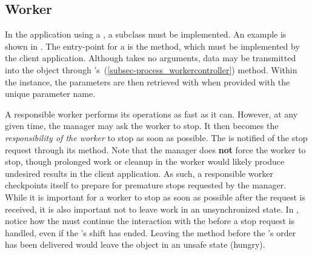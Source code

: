 \subsection{Worker}
\label{subsec-process_worker}

In the application using a , a  subclass must be
implemented.  An example  is shown in
.
The entry-point for a  is the 
method, which must be implemented by the client application.  Although
 takes no arguments, data may be transmitted
into the object through
's~(\ref{subsec-process_workercontroller})
 method.  Within the  instance,
the parameters are then retrieved with  when
provided with the unique parameter name.

A responsible worker performs its operations as fast as it can.
However, at any given time, the manager may ask the worker to
stop.  It then becomes the {\em responsibility of the worker} to 
stop as soon as possible.  The  is notified of the stop request
through its  method.  Note that the
manager does \textbf{not} force the worker to stop, though
prolonged work or cleanup in the worker would likely produce
undesired results in the client application.  As such, a responsible
worker checkpoints itself to prepare for premature stops requested by
the manager. While it is important for a worker to stop as soon
as possible after the request is received, it is also important not to leave
work in an unsynchronized state.  In ,
notice how
the  must continue the interaction with the 
before a stop request is handled, even if the 's shift has
ended.  Leaving the method before the 's order has been
delivered would leave the  object in an unsafe state (hungry). 

